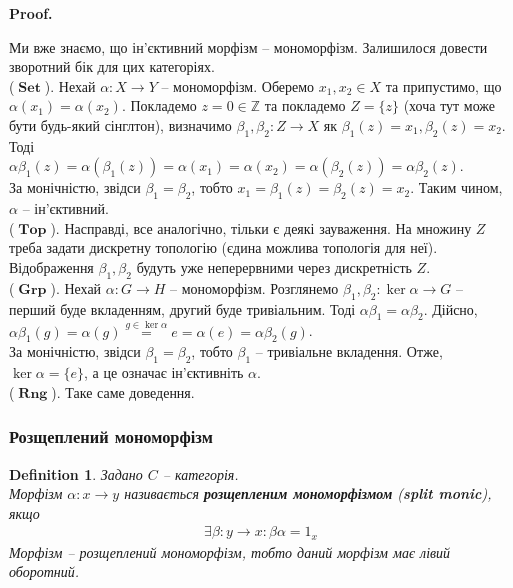 \documentclass[a4paper, 10pt]{article}
\makeatletter
\theoremstyle{theoremdd}
\newtheorem{definition}[theorem]{Definition}
\renewenvironment{proof}[1][Proof.\\]{\par
\pushQED{\hfill \qed}%
\normalfont \topsep6\p@\@plus6\p@\relax
\trivlist
\item\relax
{\bfseries
#1\@addpunct{.}}\hspace\labelsep\ignorespaces
}{%
\popQED\endtrivlist\@endpefalse
}
\DeclareMathOperator{\Set}{\textbf{Set}}
\DeclareMathOperator{\Grp}{\textbf{Grp}}
\DeclareMathOperator{\Rng}{\textbf{Rng}}
\DeclareMathOperator{\Top}{\textbf{Top}}
\makeatother
\begin{document}
\begin{proof}
Ми вже знаємо, що ін'єктивний морфізм -- мономорфізм. Залишилося довести зворотний бік для цих категоріях.
\bigskip \\
($\Set$). Нехай $\alpha \colon X \to Y$ -- мономорфізм. Оберемо $x_1,x_2 \in X$ та припустимо, що $\alpha(x_1) = \alpha(x_2)$. Покладемо $z = 0 \in \mathbb{Z}$ та покладемо $Z = \{z\}$ (хоча тут може бути будь-який сінглтон), визначимо $\beta_1, \beta_2 \colon Z \to X$ як $\beta_1(z) = x_1, \beta_2(z) = x_2$. Тоді\\
$\alpha \beta_1(z) = \alpha(\beta_1(z)) = \alpha(x_1) = \alpha(x_2) = \alpha(\beta_2(z)) = \alpha \beta_2(z)$.\\
За монічністю, звідси $\beta_1 = \beta_2$, тобто $x_1 = \beta_1(z) = \beta_2(z) = x_2$. Таким чином, $\alpha$ -- ін'єктивний.
\bigskip \\
($\Top$). Насправді, все аналогічно, тільки є деякі зауваження. На множину $Z$ треба задати дискретну топологію (єдина можлива топологія для неї). Відображення $\beta_1,\beta_2$ будуть уже неперервними через дискретність $Z$.
\bigskip \\
($\Grp$). Нехай $\alpha \colon G \to H$ -- мономорфізм. Розглянемо $\beta_1, \beta_2 \colon \ker \alpha \to G$ -- перший буде вкладенням, другий буде тривіальним. Тоді $\alpha \beta_1 = \alpha \beta_2$. Дійсно,\\
$\alpha \beta_1(g) = \alpha (g) \overset{g \in \ker \alpha}{=} e = \alpha(e) = \alpha \beta_2(g)$.\\
За монічністю, звідси $\beta_1 = \beta_2$, тобто $\beta_1$ -- тривіальне вкладення. Отже, $\ker \alpha = \{e\}$, а це означає ін'єктивніть $\alpha$.
\bigskip \\
($\Rng$). Таке саме доведення.
\end{proof}

\subsubsection{Розщеплений мономорфізм}
\begin{definition}
Задано $C$ -- категорія.\\
Морфізм $\alpha \colon x \to y$ називається \textbf{розщепленим мономорфізмом} (\textbf{split monic}), якщо
\begin{align*}
\exists \beta \colon y \to x: \beta \alpha = 1_x
\end{align*}
Морфізм -- розщеплений мономорфізм, тобто даний морфізм має лівий оборотний.
\begin{figure}[H]
\centering
{}
\end{figure}
\end{definition}
\end{document}

